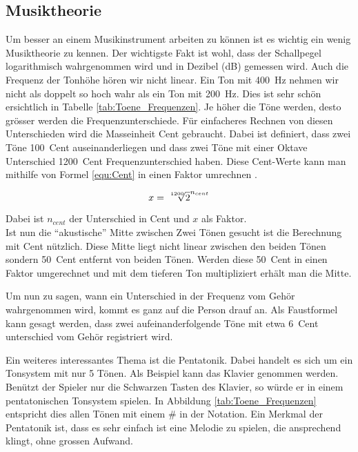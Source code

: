 \subsection{Musiktheorie}\label{subsec:Musiktheorie}

Um besser an einem Musikinstrument arbeiten zu können ist es wichtig ein wenig Musiktheorie zu kennen. Der wichtigste Fakt ist wohl, dass der Schallpegel logarithmisch wahrgenommen wird und in Dezibel (dB) gemessen wird. Auch die Frequenz der Tonhöhe hören wir nicht linear. Ein Ton mit \SI{400}{Hz} nehmen wir nicht als doppelt so hoch wahr als ein Ton mit \SI{200}{Hz}. Dies ist sehr schön ersichtlich in Tabelle \ref{tab:Toene_Frequenzen}. Je höher die Töne werden, desto grösser werden die Frequenzunterschiede. Für einfacheres Rechnen von diesen Unterschieden wird die Masseinheit Cent gebraucht. Dabei ist definiert, dass zwei Töne \SI{100}{Cent} auseinanderliegen und dass zwei Töne mit einer Oktave Unterschied \SI{1200}{Cent} Frequenzunterschied haben. Diese Cent-Werte kann man mithilfe von Formel \ref{equ:Cent} in einen Faktor umrechnen \cite{Cent}.

\begin{equation}
x = \sqrt[\leftroot{-2}\uproot{1}1200]{2}^{n_{cent}}
\label{equ:Cent}
\end{equation} 

Dabei ist \(n_{cent}\) der Unterschied in Cent und \(x\) als Faktor.\\ Ist nun die ``akustische'' Mitte zwischen Zwei Tönen gesucht ist die Berechnung mit Cent nützlich. Diese Mitte liegt nicht linear zwischen den beiden Tönen sondern \SI{50}{Cent} entfernt von beiden Tönen. Werden diese \SI{50}{Cent} in einen Faktor umgerechnet und mit dem tieferen Ton multipliziert erhält man die Mitte.

Um nun zu sagen, wann ein Unterschied in der Frequenz vom Gehör wahrgenommen wird, kommt es ganz auf die Person drauf an. Als Faustformel kann gesagt werden, dass zwei aufeinanderfolgende Töne mit etwa \SI{6}{Cent} unterschied vom Gehör registriert wird.\cite{Cent}

Ein weiteres interessantes Thema ist die Pentatonik. Dabei handelt es sich um ein Tonsystem mit nur 5 Tönen. Als Beispiel kann das Klavier genommen werden. Benützt der Spieler nur die Schwarzen Tasten des Klavier, so würde er in einem pentatonischen Tonsystem spielen. In Abbildung \ref{tab:Toene_Frequenzen} entspricht dies allen Tönen mit einem \# in der Notation. Ein Merkmal der Pentatonik ist, dass es sehr einfach ist eine Melodie zu spielen, die ansprechend klingt, ohne grossen Aufwand.\cite{Pentatonik}



